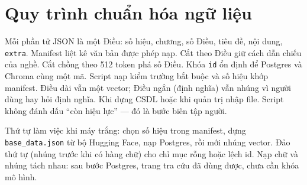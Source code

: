 \section{Quy trình chuẩn hóa ngữ liệu}

\boncau
{Mỗi phần tử JSON là một Điều: số hiệu, chương, số Điều, tiêu đề, nội dung,
\texttt{extra}. Manifest liệt kê văn bản được phép nạp.}
{Cắt theo Điều giữ cách dẫn chiếu của nghề. Cắt chồng theo 512 token phá số
Điều. Khóa \texttt{id} ổn định để Postgres và Chroma cùng một mã.}
{Script nạp kiểm trường bắt buộc và số hiệu khớp manifest. Điều dài vẫn một
vector; Điều ngắn (định nghĩa) vẫn nhúng vì người dùng hay hỏi định nghĩa.}
{Khi dựng CSDL hoặc khi quản trị nhập file. Script không đánh dấu ``còn hiệu
lực'' --- đó là bước biên tập người.}

Thứ tự làm việc khi máy trắng: chọn số hiệu trong manifest, dựng
\texttt{base\_data.json} từ bộ Hugging Face, nạp Postgres, rồi mới nhúng
vector. Đảo thứ tự (nhúng trước khi có hàng chữ) cho chỉ mục rỗng hoặc lệch id.
Nạp chữ và nhúng tách nhau: sau bước Postgres, trang tra cứu đã dùng được, chưa
cần khóa mô hình.
